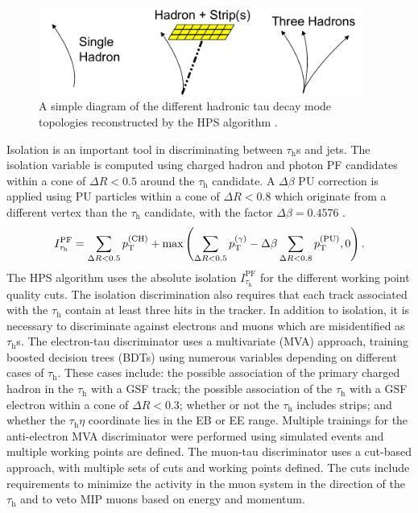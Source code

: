 \documentclass[12pt]{thesis}  %
\newcommand{\tauh}{\ensuremath{\tau_{\text{h}}}\xspace}
\begin{document}
\begin{figure}[hbt]
\begin{center}
\includegraphics[width=0.95\textwidth]{figures/DP2014_015-fig-mod.pdf}
\caption{A simple diagram of the different hadronic tau decay mode topologies reconstructed by the HPS algorithm \cite{CMS-DP-2014-015}.}
\label{fig:tau-modes}
\end{center}
\end{figure}

Isolation is an important tool in discriminating between $\tauh$s and jets. The isolation variable is computed using charged hadron and photon PF candidates within a cone of $\Delta R < 0.5$ around the \tauh candidate. A $\Delta\beta$ PU correction is applied using PU particles within a cone of $\Delta R < 0.8$ which originate from a different vertex than the \tauh candidate, with the factor $\Delta\beta = 0.4576$ \cite{CMS-DP-2014-015}.
\begin{equation}
I^{\text{PF}}_{\tauh} = \sum_{\Delta R < 0.5}{\pt^{(\text{CH})}} + \text{max}\left( \sum_{\Delta R < 0.5}{\pt^{(\gamma)}} - \Delta\beta \sum_{\Delta R < 0.8}{\pt^{(\text{PU})}}, 0 \right).
\end{equation}
The HPS algorithm uses the absolute isolation $I^{\text{PF}}_{\tauh}$ for the different working point quality cuts. The isolation discrimination also requires that each track associated with the \tauh contain at least three hits in the tracker. In addition to isolation, it is necessary to discriminate against electrons and muons which are misidentified as $\tauh$s. The electron-tau discriminator uses a multivariate (MVA) approach, training boosted decision trees (BDTs) using numerous variables depending on different cases of \tauh. These cases include: the possible association of the primary charged hadron in the \tauh with a GSF track; the possible association of the \tauh with a GSF electron within a cone of $\Delta R < 0.3$; whether or not the \tauh includes strips; and whether the \tauh $\eta$ coordinate lies in the EB or EE range. Multiple trainings for the anti-electron MVA discriminator were performed using simulated events and multiple working points are defined. The muon-tau discriminator uses a cut-based approach, with multiple sets of cuts and working points defined. The cuts include requirements to minimize the activity in the muon system in the direction of the \tauh and to veto MIP muons based on energy and momentum. 
\end{document}
